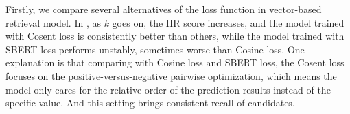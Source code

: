 Firstly, we compare several alternatives of the loss function in vector-based retrieval model. In , as $k$ goes on, the HR score increases, and the model trained with Cosent loss is consistently better than others, while the model trained with SBERT loss performs unstably, sometimes worse than Cosine loss. 
One explanation is that comparing with Cosine loss and SBERT loss, the Cosent loss focuses on the positive-versus-negative pairwise optimization, which means the model only cares for the relative order of the prediction results instead of the specific value. And this setting brings consistent recall of candidates.

